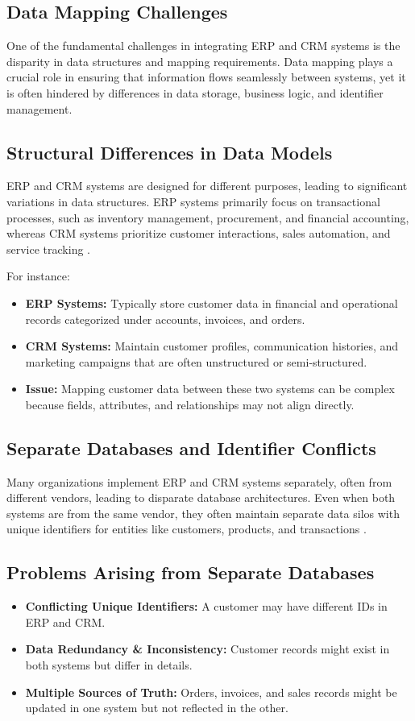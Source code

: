 \subsection{Data Mapping Challenges}
One of the fundamental challenges in integrating ERP and CRM systems is the disparity in data structures and mapping requirements. Data mapping plays a crucial role in ensuring that information flows seamlessly between systems, yet it is often hindered by differences in data storage, business logic, and identifier management.

\subsection{Structural Differences in Data Models}
ERP and CRM systems are designed for different purposes, leading to significant variations in data structures. ERP systems primarily focus on transactional processes, such as inventory management, procurement, and financial accounting, whereas CRM systems prioritize customer interactions, sales automation, and service tracking \cite{yanjing2009}.

For instance:
\begin{itemize}
    \item \textbf{ERP Systems:} Typically store customer data in financial and operational records categorized under accounts, invoices, and orders.
    \item \textbf{CRM Systems:} Maintain customer profiles, communication histories, and marketing campaigns that are often unstructured or semi-structured.
    \item \textbf{Issue:} Mapping customer data between these two systems can be complex because fields, attributes, and relationships may not align directly.
\end{itemize}

\subsection{Separate Databases and Identifier Conflicts}
Many organizations implement ERP and CRM systems separately, often from different vendors, leading to disparate database architectures. Even when both systems are from the same vendor, they often maintain separate data silos with unique identifiers for entities like customers, products, and transactions \cite{tomic2016}.

\subsection{Problems Arising from Separate Databases}
\begin{itemize}
    \item \textbf{Conflicting Unique Identifiers:} A customer may have different IDs in ERP and CRM.
    \item \textbf{Data Redundancy \& Inconsistency:} Customer records might exist in both systems but differ in details.
    \item \textbf{Multiple Sources of Truth:} Orders, invoices, and sales records might be updated in one system but not reflected in the other.
\end{itemize}

